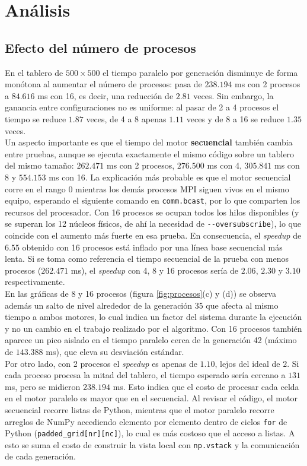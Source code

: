 \documentclass{article}
\begin{document}
\section{Análisis}

\subsection{Efecto del número de procesos}
En el tablero de $500 \times 500$ el tiempo paralelo por generación disminuye de forma monótona al aumentar el número de procesos: pasa de $238.194$ ms con 2 procesos a $84.616$ ms con 16, es decir, una reducción de $2.81$ veces. Sin embargo, la ganancia entre configuraciones no es uniforme: al pasar de 2 a 4 procesos el tiempo se reduce $1.87$ veces, de 4 a 8 apenas $1.11$ veces y de 8 a 16 se reduce $1.35$ veces.\\

Un aspecto importante es que el tiempo del motor \textbf{secuencial} también cambia entre pruebas, aunque se ejecuta exactamente el mismo código sobre un tablero del mismo tamaño: $262.471$ ms con 2 procesos, $276.500$ ms con 4, $305.841$ ms con 8 y $554.153$ ms con 16. La explicación más probable es que el motor secuencial corre en el rango 0 mientras los demás procesos MPI siguen vivos en el mismo equipo, esperando el siguiente comando en \verb|comm.bcast|, por lo que comparten los recursos del procesador. Con 16 procesos se ocupan todos los hilos disponibles (y se superan los 12 núcleos físicos, de ahí la necesidad de \verb|--oversubscribe|), lo que coincide con el aumento más fuerte en esa prueba. En consecuencia, el \textit{speedup} de $6.55$ obtenido con 16 procesos está inflado por una línea base secuencial más lenta. Si se toma como referencia el tiempo secuencial de la prueba con menos procesos ($262.471$ ms), el \textit{speedup} con 4, 8 y 16 procesos sería de $2.06$, $2.30$ y $3.10$ respectivamente.\\

En las gráficas de 8 y 16 procesos (figura \ref{fig:procesos}(c) y (d)) se observa además un salto de nivel alrededor de la generación 35 que afecta al mismo tiempo a ambos motores, lo cual indica un factor del sistema durante la ejecución y no un cambio en el trabajo realizado por el algoritmo. Con 16 procesos también aparece un pico aislado en el tiempo paralelo cerca de la generación 42 (máximo de $143.388$ ms), que eleva su desviación estándar.\\

Por otro lado, con 2 procesos el \textit{speedup} es apenas de $1.10$, lejos del ideal de $2$. Si cada proceso procesa la mitad del tablero, el tiempo esperado sería cercano a $131$ ms, pero se midieron $238.194$ ms. Esto indica que el costo de procesar cada celda en el motor paralelo es mayor que en el secuencial. Al revisar el código, el motor secuencial recorre listas de Python, mientras que el motor paralelo recorre arreglos de NumPy accediendo elemento por elemento dentro de ciclos \verb|for| de Python (\verb|padded_grid[nr][nc]|), lo cual es más costoso que el acceso a listas. A esto se suma el costo de construir la vista local con \verb|np.vstack| y la comunicación de cada generación.
\end{document}
